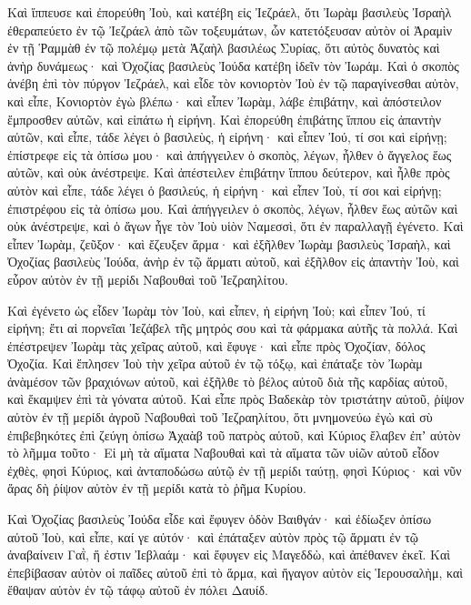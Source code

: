 {Καὶ ἵππευσε καὶ ἐπορεύθη Ἰοὺ, καὶ κατέβη εἰς Ἰεζράελ, ὅτι Ἰωρὰμ βασιλεὺς Ἰσραὴλ ἐθεραπεύετο ἐν τῷ Ἰεζράελ ἀπὸ τῶν τοξευμάτων, ὧν κατετόξευσαν αὐτὸν οἱ Ἀραμὶν ἐν τῇ Ῥαμμὰθ ἐν τῷ πολέμῳ μετὰ Ἁζαὴλ βασιλέως Συρίας, ὅτι αὐτὸς δυνατὸς καὶ ἀνὴρ δυνάμεως· καὶ Ὀχοζίας βασιλεὺς Ἰούδα κατέβη ἰδεῖν τὸν Ἰωράμ.
Καὶ ὁ σκοπὸς ἀνέβη ἐπὶ τὸν πύργον Ἰεζράελ, καὶ εἶδε τὸν κονιορτὸν Ἰοὺ ἐν τῷ παραγίνεσθαι αὐτὸν, καὶ εἶπε, Κονιορτὸν ἐγὼ βλέπω· καὶ εἶπεν Ἰωρὰμ, λάβε ἐπιβάτην, καὶ ἀπόστειλον ἔμπροσθεν αὐτῶν, καὶ εἰπάτω ἡ εἰρήνη.
Καὶ ἐπορεύθη ἐπιβάτης ἵππου εἰς ἀπαντὴν αὐτῶν, καὶ εἶπε, τάδε λέγει ὁ βασιλεὺς, ἡ εἰρήνη· καὶ εἶπεν Ἰού, τί σοι καὶ εἰρήνῃ; ἐπίστρεφε εἰς τὰ ὀπίσω μου· καὶ ἀπήγγειλεν ὁ σκοπὸς, λέγων, ἦλθεν ὁ ἄγγελος ἕως αὐτῶν, καὶ οὐκ ἀνέστρεψε.
Καὶ ἀπέστειλεν ἐπιβάτην ἵππου δεύτερον, καὶ ἦλθε πρὸς αὐτὸν καὶ εἶπε, τάδε λέγει ὁ βασιλεύς, ἡ εἰρήνη· καὶ εἶπεν Ἰοὺ, τί σοι καὶ εἰρήνῃ; ἐπιστρέφου εἰς τὰ ὀπίσω μου.
Καὶ ἀπήγγειλεν ὁ σκοπὸς, λέγων, ἦλθεν ἕως αὐτῶν καὶ οὐκ ἀνέστρεψε, καὶ ὁ ἄγων ἦγε τὸν Ἰοὺ υἱὸν Ναμεσσὶ, ὅτι ἐν παραλλαγῇ ἐγένετο.
Καὶ εἶπεν Ἰωρὰμ, ζεῦξον· καὶ ἔζευξεν ἅρμα· καὶ ἐξῆλθεν Ἰωρὰμ βασιλεὺς Ἰσραὴλ, καὶ Ὀχοζίας βασιλεὺς Ἰούδα, ἀνὴρ ἐν τῷ ἅρματι αὐτοῦ, καὶ ἐξῆλθον εἰς ἀπαντὴν Ἰοὺ, καὶ εὗρον αὐτὸν ἐν τῇ μερίδι Ναβουθαὶ τοῦ Ἰεζραηλίτου.
\par }{\PP {}Καὶ ἐγένετο ὡς εἶδεν Ἰωρὰμ τὸν Ἰοὺ, καὶ εἶπεν, ἡ εἰρήνη Ἰοὺ; καὶ εἶπεν Ἰού, τί εἰρήνη; ἔτι αἱ πορνεῖαι Ἰεζάβελ τῆς μητρός σου καὶ τὰ φάρμακα αὐτῆς τὰ πολλά.
Καὶ ἐπέστρεψεν Ἰωρὰμ τὰς χεῖρας αὐτοῦ, καὶ ἔφυγε· καὶ εἶπε πρὸς Ὀχοζίαν, δόλος Ὀχοζία.
Καὶ ἔπλησεν Ἰοὺ τὴν χεῖρα αὐτοῦ ἐν τῷ τόξῳ, καὶ ἐπάταξε τὸν Ἰωρὰμ ἀνὰμέσον τῶν βραχιόνων αὐτοῦ, καὶ ἐξῆλθε τὸ βέλος αὐτοῦ διὰ τῆς καρδίας αὐτοῦ, καὶ ἔκαμψεν ἐπὶ τὰ γόνατα αὐτοῦ.
Καὶ εἶπε πρὸς Βαδεκὰρ τὸν τριστάτην αὐτοῦ, ῥίψον αὐτὸν ἐν τῇ μερίδι ἀγροῦ Ναβουθαὶ τοῦ Ἰεζραηλίτου, ὅτι μνημονεύω ἐγὼ καὶ σὺ ἐπιβεβηκότες ἐπὶ ζεύγη ὀπίσω Ἀχαὰβ τοῦ πατρὸς αὐτοῦ, καὶ Κύριος ἔλαβεν ἐπʼ αὐτὸν τὸ λῆμμα τοῦτο·
Εἰ μὴ τὰ αἵματα Ναβουθαὶ καὶ τὰ αἵματα τῶν υἱῶν αὐτοῦ εἶδον ἐχθὲς, φησὶ Κύριος, καὶ ἀνταποδώσω αὐτῷ ἐν τῇ μερίδι ταύτῃ, φησὶ Κύριος· καὶ νῦν ἄρας δὴ ῥίψον αὐτὸν ἐν τῇ μερίδι κατὰ τὸ ῥῆμα Κυρίου.
\par }{\PP {}Καὶ Ὀχοζίας βασιλεὺς Ἰούδα εἶδε καὶ ἔφυγεν ὁδὸν Βαιθγάν· καὶ ἐδίωξεν ὀπίσω αὐτοῦ Ἰοὺ, καὶ εἶπε, καί γε αὐτόν· καὶ ἐπάταξεν αὐτὸν πρὸς τῷ ἅρματι ἐν τῷ ἀναβαίνειν Γαῒ, ἥ ἐστιν Ἰεβλαάμ· καὶ ἔφυγεν εἰς Μαγεδδὼ, καὶ ἀπέθανεν ἐκεῖ.
Καὶ ἐπεβίβασαν αὐτὸν οἱ παῖδες αὐτοῦ ἐπὶ τὸ ἅρμα, καὶ ἤγαγον αὐτὸν εἰς Ἱερουσαλὴμ, καὶ ἔθαψαν αὐτὸν ἐν τῷ τάφῳ αὐτοῦ ἐν πόλει Δαυίδ.
}
